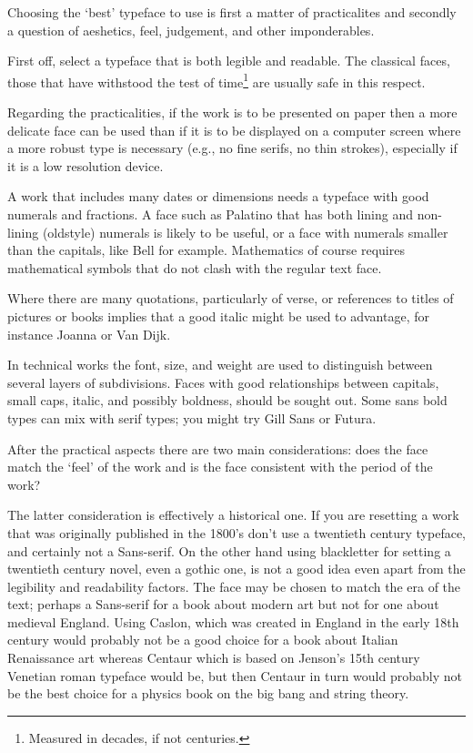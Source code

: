 \documentclass[10pt,a4paper,oneside,extrafontsizes]{memoir}%
\begin{document}
\begin{paracol}{2}
\switchEng
    Choosing the `best' typeface to use is first a matter of practicalites
and secondly a question of aeshetics, feel, judgement, and other 
imponderables.

    First off, 
select a typeface that is both legible and readable.
The classical faces, those that have withstood the test of 
time\footnote{Measured in decades, if not centuries.} are
usually safe in this respect.

   Regarding the practicalities, 
if the work is to be presented on paper then
a more delicate face can be used than if it is to be displayed on a computer
screen where a more robust type is necessary (e.g., no fine serifs, no 
thin strokes), especially if it is a low resolution device.

  A work that includes many dates or dimensions needs a typeface with good
numerals and fractions. A face such as Palatino
 that has both lining and non-lining (oldstyle)
numerals is likely to be useful, or a face with numerals smaller than the
capitals, like Bell for example. Mathematics of course requires mathematical
symbols that do not clash with the regular text face.

    Where there are many quotations, particularly of verse, or references 
to titles of pictures or books implies that a good italic might be used
to advantage, for instance Joanna or 
Van Dijk.

    In technical works the font, size, and weight are used to distinguish 
between several layers of subdivisions. Faces with good relationships between
capitals, small caps, italic, and possibly boldness, should be sought out.  
Some sans bold types can mix with serif types; you might try 
Gill Sans or Futura.



    After the practical aspects there are two main considerations: 
does the face match the `feel' of the work and is the face consistent 
with the period of the 
work? 

    The latter consideration is effectively a historical one. If you are
resetting a work that was originally published in the 1800's don't
use a twentieth century typeface, and certainly not a Sans-serif. On the
other hand using blackletter for setting a twentieth century novel, 
even a gothic one, is not a good idea even apart from the legibility and
readability factors.
    The face may be chosen to match the era of the text; perhaps a Sans-serif
for a book about modern art but not for one about medieval England. Using 
Caslon, which was created in England in the early 
18th century would 
probably not be a good choice for a book about Italian Renaissance art 
whereas Centaur which is based on Jenson's 
15th century Venetian roman
typeface would be, but then Centaur in turn would probably not be the
best choice for a physics book on the big bang and string theory. 


\end{paracol}
\end{document}
